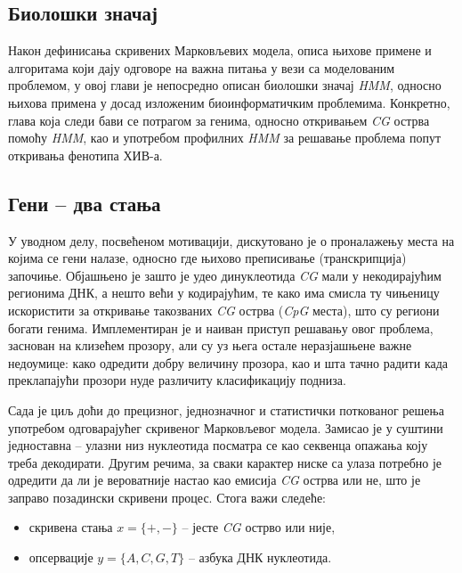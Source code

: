 \documentclass[12pt,oneside]{memoir}
\begin{document}
\begin{CJK}{UTF8}{ipxm}
\chapter{Биолошки значај}
Након дефинисања скривених Марковљевих модела, описа њихове примене и алгоритама који дају одговоре на важна питања у вези са моделованим проблемом, у овој глави је непосредно описан биолошки значај \textit{HMM}, односно њихова примена у досад изложеним биоинформатичким проблемима. Конкретно, глава која следи бави се потрагом за генима, односно откривањем \textit{CG} острва помоћу \textit{HMM}, као и употребом профилних \textit{HMM} за решавање проблема попут откривања фенотипа ХИВ-а.

\section{Гени -- два стања}
У уводном делу, посвећеном мотивацији, дискутовано је о проналажењу места на којима се гени налазе, односно где њихово преписивање (транскрипција) започиње. Објашњено је зашто је удео динуклеотида \textit{CG} мали у некодирајућим регионима ДНК, а нешто већи у кодирајућим, те како има смисла ту чињеницу искористити за откривање такозваних \textit{CG} острва (\textit{CpG} места), што су региони богати генима. Имплементиран је и наиван приступ решавању овог проблема, заснован на клизећем прозору, али су уз њега остале неразјашњене важне недоумице: како одредити добру величину прозора, као и шта тачно радити када преклапајући прозори нуде различиту класификацију подниза.

Сада је циљ доћи до прецизног, једнозначног и статистички поткованог решења употребом одговарајућег скривеног Марковљевог модела. Замисао је у суштини једноставна -- улазни низ нуклеотида посматра се као секвенца опажања коју треба декодирати. Другим речима, за сваки карактер ниске са улаза потребно је одредити да ли је вероватније настао као емисија \textit{CG} острва или не, што је заправо позадински скривени процес. Стога важи следеће:
\begin{itemize}
  \item скривена стања $x = \{+, -\}$ -- јесте \textit{CG} острво или није,
  \item опсервације $y = \{A, C, G, T\}$ -- азбука ДНК нуклеотида.
\end{itemize}


\end{CJK}
\end{document}
